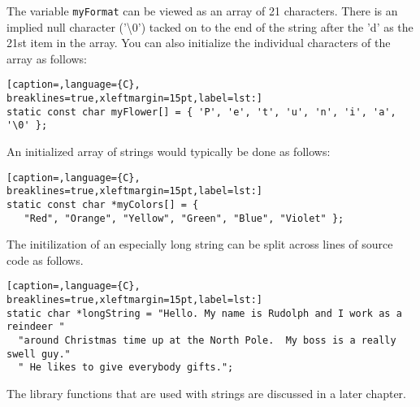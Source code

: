The variable \texttt{myFormat} can be viewed as an array of 21 characters.
There is an implied null character ('\textbackslash{}0') tacked on to the end
of the string after the 'd' as the 21st item in the array.  You can also
initialize the individual characters of the array as follows:
\lstset{basicstyle=\scriptsize, numbers=left, captionpos=b, tabsize=4}
\begin{lstlisting}[caption=,language={C},
breaklines=true,xleftmargin=15pt,label=lst:]
static const char myFlower[] = { 'P', 'e', 't', 'u', 'n', 'i', 'a', '\0' };
\end{lstlisting}

An initialized array of strings would typically be done as follows:
\lstset{basicstyle=\scriptsize, numbers=left, captionpos=b, tabsize=4}
\begin{lstlisting}[caption=,language={C},
breaklines=true,xleftmargin=15pt,label=lst:]
static const char *myColors[] = {
   "Red", "Orange", "Yellow", "Green", "Blue", "Violet" };
\end{lstlisting}

The initilization of an especially long string can be split across lines of
source code as follows.
\lstset{basicstyle=\scriptsize, numbers=left, captionpos=b, tabsize=4}
\begin{lstlisting}[caption=,language={C},
breaklines=true,xleftmargin=15pt,label=lst:]
static char *longString = "Hello. My name is Rudolph and I work as a reindeer "
  "around Christmas time up at the North Pole.  My boss is a really swell guy."
  " He likes to give everybody gifts.";
\end{lstlisting}

The library functions that are used with strings are discussed in a later chapter.

